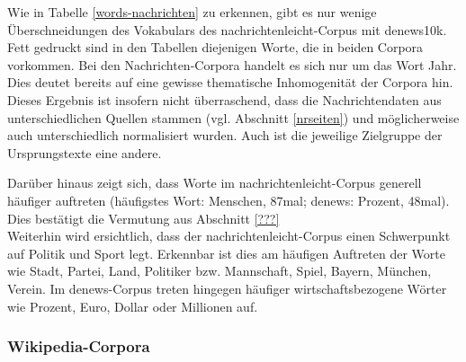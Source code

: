 \documentclass[11pt, a4paper]{article}
\begin{document}
Wie in Tabelle \ref{words-nachrichten} zu erkennen, gibt es nur wenige
Überschneidungen des Vokabulars des nachrichtenleicht-Corpus mit denews10k.
Fett gedruckt sind in den Tabellen diejenigen Worte, die in beiden Corpora
vorkommen.
Bei den Nachrichten-Corpora handelt es sich nur um das Wort Jahr.
Dies deutet bereits auf eine gewisse thematische Inhomogenität der Corpora hin.
Dieses Ergebnis ist insofern nicht überraschend, dass die Nachrichtendaten aus
unterschiedlichen Quellen stammen (vgl. Abschnitt \ref{nrseiten}) und
möglicherweise auch unterschiedlich normalisiert wurden.
Auch ist die jeweilige Zielgruppe der Ursprungstexte eine andere.

Darüber hinaus zeigt sich, dass Worte im nachrichtenleicht-Corpus generell
häufiger auftreten (häufigstes Wort: Menschen, 87mal; denews: Prozent, 48mal).
Dies bestätigt die Vermutung aus Abschnitt \ref{???}\\
Weiterhin wird ersichtlich, dass der nachrichtenleicht-Corpus einen Schwerpunkt
auf Politik und Sport legt.
Erkennbar ist dies am häufigen Auftreten der Worte wie Stadt, Partei, Land,
Politiker bzw. Mannschaft, Spiel, Bayern, München, Verein.
Im denews-Corpus treten hingegen häufiger wirtschaftsbezogene Wörter wie Prozent,
Euro, Dollar oder Millionen auf.


\subsubsection{Wikipedia-Corpora}
\end{document}
